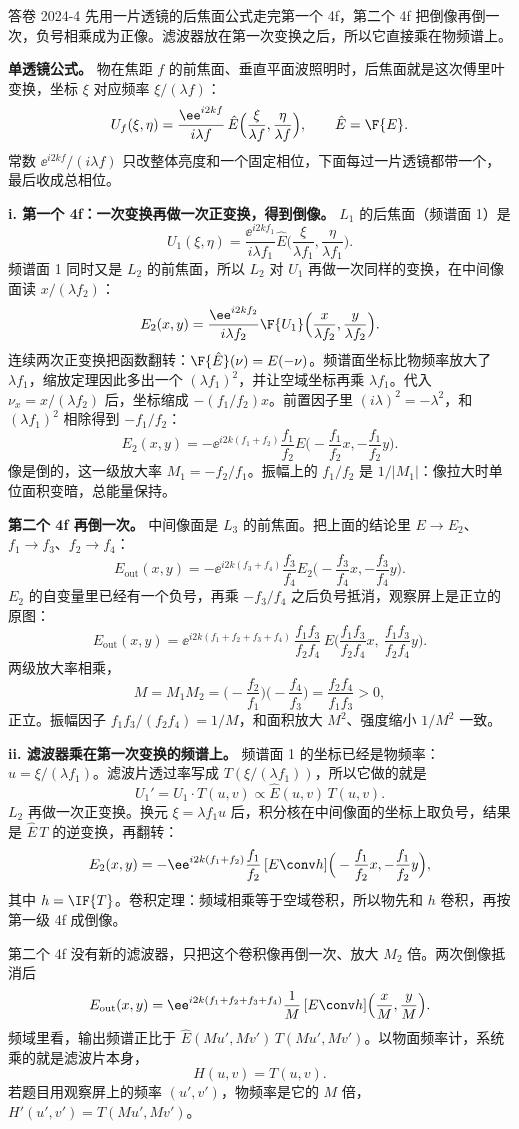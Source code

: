 \begin{exam}{答卷 2024-4}
先用一片透镜的后焦面公式走完第一个 4f，第二个 4f 把倒像再倒一次，负号相乘成为正像。滤波器放在第一次变换之后，所以它直接乘在物频谱上。

\textbf{单透镜公式。} 物在焦距 $f$ 的前焦面、垂直平面波照明时，后焦面就是这次傅里叶变换，坐标 $\xi$ 对应频率 $\xi/(\lambda f)$：
\[
U_f(\xi,\eta)=\frac{\ee^{i2kf}}{i\lambda f}\,\hat E\Big(\frac{\xi}{\lambda f},\frac{\eta}{\lambda f}\Big),\qquad\hat E=\F\{E\}.
\]
常数 $\ee^{i2kf}/(i\lambda f)$ 只改整体亮度和一个固定相位，下面每过一片透镜都带一个，最后收成总相位。

\textbf{i. 第一个 4f：一次变换再做一次正变换，得到倒像。}
$L_1$ 的后焦面（频谱面 1）是
\[
U_1(\xi,\eta)=\frac{\ee^{i2kf_1}}{i\lambda f_1}\hat E\Big(\frac{\xi}{\lambda f_1},\frac{\eta}{\lambda f_1}\Big).
\]
频谱面 1 同时又是 $L_2$ 的前焦面，所以 $L_2$ 对 $U_1$ 再做一次同样的变换，在中间像面读 $x/(\lambda f_2)$：
\[
E_2(x,y)=\frac{\ee^{i2kf_2}}{i\lambda f_2}\F\{U_1\}\Big(\frac{x}{\lambda f_2},\frac{y}{\lambda f_2}\Big).
\]
连续两次正变换把函数翻转：$\F\{\hat E\}(\nu)=E(-\nu)$。频谱面坐标比物频率放大了 $\lambda f_1$，缩放定理因此多出一个 $(\lambda f_1)^2$，并让空域坐标再乘 $\lambda f_1$。代入 $\nu_x=x/(\lambda f_2)$ 后，坐标缩成 $-(f_1/f_2)x$。前置因子里 $(i\lambda)^2=-\lambda^2$，和 $(\lambda f_1)^2$ 相除得到 $-f_1/f_2$：
\[
E_2(x,y)=-\ee^{i2k(f_1+f_2)}\frac{f_1}{f_2}E\Big(-\frac{f_1}{f_2}x,-\frac{f_1}{f_2}y\Big).
\]
像是倒的，这一级放大率 $M_1=-f_2/f_1$。振幅上的 $f_1/f_2$ 是 $1/|M_1|$：像拉大时单位面积变暗，总能量保持。

\textbf{第二个 4f 再倒一次。}
中间像面是 $L_3$ 的前焦面。把上面的结论里 $E\to E_2$、$f_1\to f_3$、$f_2\to f_4$：
\[
E_{\text{out}}(x,y)=-\ee^{i2k(f_3+f_4)}\frac{f_3}{f_4}E_2\Big(-\frac{f_3}{f_4}x,-\frac{f_3}{f_4}y\Big).
\]
$E_2$ 的自变量里已经有一个负号，再乘 $-f_3/f_4$ 之后负号抵消，观察屏上是正立的原图：
\[
E_{\text{out}}(x,y)
=\boxed{\ee^{i2k(f_1+f_2+f_3+f_4)}\,\frac{f_1f_3}{f_2f_4}\,E\Big(\frac{f_1f_3}{f_2f_4}x,\ \frac{f_1f_3}{f_2f_4}y\Big)} .
\]
两级放大率相乘，
\[
\boxed{M=M_1M_2=\Big(-\frac{f_2}{f_1}\Big)\Big(-\frac{f_4}{f_3}\Big)=\frac{f_2f_4}{f_1f_3}>0} ,
\]
正立。振幅因子 $f_1f_3/(f_2f_4)=1/M$，和面积放大 $M^2$、强度缩小 $1/M^2$ 一致。

\textbf{ii. 滤波器乘在第一次变换的频谱上。}
频谱面 1 的坐标已经是物频率：$u=\xi/(\lambda f_1)$。滤波片透过率写成 $T(\xi/(\lambda f_1))$，所以它做的就是
\[
U_1'=U_1\cdot T(u,v)\propto\hat E(u,v)\,T(u,v).
\]
$L_2$ 再做一次正变换。换元 $\xi=\lambda f_1 u$ 后，积分核在中间像面的坐标上取负号，结果是 $\hat E\,T$ 的逆变换，再翻转：
\[
E_2(x,y)=-\ee^{i2k(f_1+f_2)}\frac{f_1}{f_2}\,[E\conv h]\Big(-\frac{f_1}{f_2}x,-\frac{f_1}{f_2}y\Big),
\]
其中 $h=\IF\{T\}$。卷积定理：频域相乘等于空域卷积，所以物先和 $h$ 卷积，再按第一级 4f 成倒像。

第二个 4f 没有新的滤波器，只把这个卷积像再倒一次、放大 $M_2$ 倍。两次倒像抵消后
\[
E_{\text{out}}(x,y)=\ee^{i2k(f_1+f_2+f_3+f_4)}\frac1M\,[E\conv h]\Big(\frac xM,\frac yM\Big).
\]
频域里看，输出频谱正比于 $\hat E(Mu',Mv')\,T(Mu',Mv')$。以物面频率计，系统乘的就是滤波片本身，
\[
\boxed{H(u,v)=T(u,v)} .
\]
若题目用观察屏上的频率 $(u',v')$，物频率是它的 $M$ 倍，$H'(u',v')=T(Mu',Mv')$。
\end{exam}


